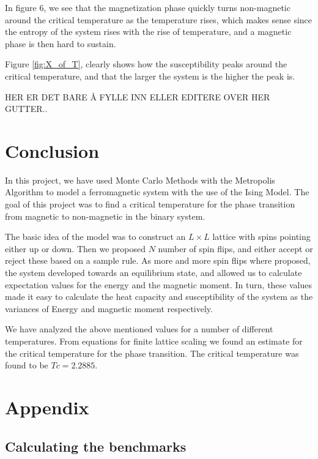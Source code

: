 \documentclass[12pt,english,a4paper]{article}
\begin{document}
In figure 6, we see that the magnetization phase quickly turns non-magnetic around the critical temperature as the temperature rises, which makes sense since the entropy of the system rises with the rise of temperature, and a magnetic phase is then hard to sustain. 

Figure \ref{fig:X_of_T}, clearly shows how the susceptibility peaks around the critical temperature, and that the larger the system is the higher the peak is. 

HER ER DET BARE Å FYLLE INN ELLER EDITERE OVER HER GUTTER.. 

\section{Conclusion} \label{conclusion}

In this project, we have used Monte Carlo Methods with the Metropolis Algorithm to model a ferromagnetic system with the use of the Ising Model. The goal of this project was to find a critical temperature for the phase transition from magnetic to non-magnetic in the binary system.

The basic idea of the model was to construct an $L \times L$ lattice with spins pointing either up or down. Then we proposed $N$ number of spin flips, and either accept or reject these based on a sample rule. As more and more spin flips where proposed, the system developed towards an equilibrium state, and allowed us to calculate expectation values for the energy and the magnetic moment. In turn, these values made it easy to calculate the heat capacity and susceptibility of the system as the variances of Energy and magnetic moment respectively. 

We have analyzed the above mentioned values for a number of different temperatures. From equations for finite lattice scaling we found an estimate for the critical temperature for the phase transition. The critical temperature was found to be $Tc = 2.2885$.


\section{Appendix} \label{appendix}

\subsection{Calculating the benchmarks}
\end{document}
